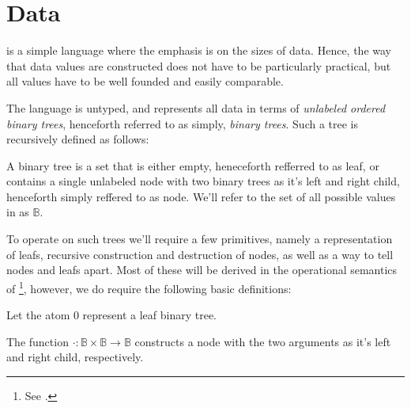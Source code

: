 \section{Data}

\D{} is a simple language where the emphasis is on the sizes of data. Hence,
the way that data values are constructed does not have to be particularly
practical, but all values have to be well founded and easily comparable.

The language \D{} is untyped, and represents all data in terms of
\emph{unlabeled ordered binary trees}, henceforth referred to as simply,
\emph{binary trees}. Such a tree is recursively defined as follows:

\begin{definition}

A binary tree is a set that is either empty, heneceforth refferred to as leaf,
or contains a single unlabeled node with two binary trees as it's left and
right child, henceforth simply reffered to as node. We'll refer to the set of
all possible values in \D{} as $\mathbb{B}$.

\end{definition}

To operate on such trees we'll require a few primitives, namely a
representation of leafs, recursive construction and destruction of nodes, as
well as a way to tell nodes and leafs apart. Most of these will be derived in
the operational semantics of \D{}\footnote{See .},
however, we do require the following basic definitions:

\begin{definition}

Let the atom $0$ represent a leaf binary tree.

\end{definition}

\begin{definition}

The function $\cdot
:\mathbb{B}\times\mathbb{B}\rightarrow\mathbb{B}$ constructs a node with the
two arguments as it's left and right child, respectively. 

\end{definition}

